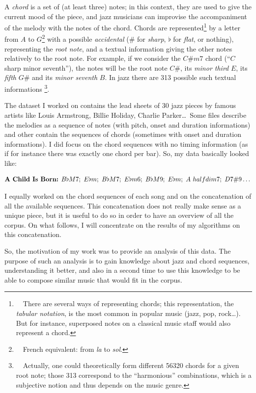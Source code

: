 \documentclass[a4paper,10pt]{article}
\newcommand{\guill}[1]{``#1''}
\begin{document}
A \emph{chord} is a set of (at least three) notes; in this context, they are used to give the current mood of the piece, and jazz musicians can improvise the accompaniment of the melody with the notes of the chord. Chords are represented\footnote{~~There are several ways of representing chords; this representation, the \emph{tabular notation}, is the most common in popular music (jazz, pop, rock\dots). But for instance, superposed notes on a classical music staff would also represent a chord.} 
by a letter from $A$ to $G$\footnote{~~French equivalent: from \emph{la} to \emph{sol}.} 
with a possible \emph{accidental} ($\#$ for \emph{sharp}, $\flat$ for \emph{flat}, or nothing), representing the \emph{root note}, and a textual information giving the other notes relatively to the root note. For example, if we consider the $C\#m7$ chord (\guill{$C$ sharp minor seventh}), the notes will be the root note $C\#$, its \emph{minor third} $E$, its \emph{fifth} $G\#$ and its \emph{minor seventh} $B$. In jazz there are 313 possible such textual informations
\footnote{~~Actually, one could theoretically form different 56320 chords for a given root note; those 313 correspond to the \guill{harmonious} combinations, which is a subjective notion and thus depends on the music genre.}.

The dataset I worked on contains the lead sheets of 30 jazz pieces by famous artists like Louis Armstrong, Billie Holiday, Charlie Parker\dots~Some files describe the melodies as a sequence of notes (with pitch, onset and duration informations) and other contain the sequences of chords (sometimes with onset and duration informations). I did focus on the chord sequences with no timing information (as if for instance there was exactly one chord per bar). So, my data basically looked like:

\begin{equation*}
\text{\textbf{A Child Is Born:} } B\flat M7;~E\flat m;~B\flat M7;~E\flat m6;~B\flat M9;~E\flat m;~A~halfdim7;~D 7\#9\dots
\end{equation*}

I equally worked on the chord sequences of each song and on the concatenation of all the available sequences. This concatenation does not really make sense as a unique piece, but it is useful to do so in order to have an overview of all the corpus. On what follows, I will concentrate on the results of my algorithms on this concatenation.

So, the motivation of my work was to provide an analysis of this data. The purpose of such an analysis is to gain knowledge about jazz and chord sequences, understanding it better, and also in a second time to use this knowledge to be able to compose similar music that would fit in the corpus.
\end{document}
